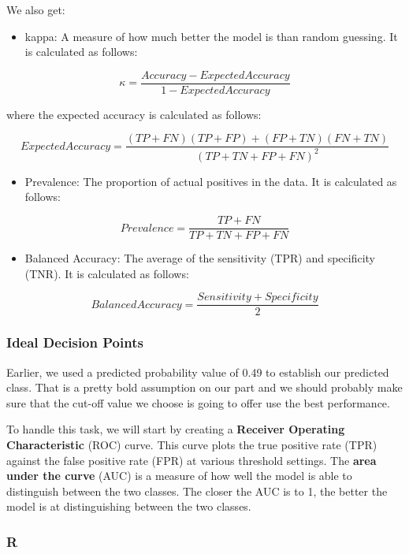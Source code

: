\documentclass[
  letterpaper,
]{krantz}
\providecommand{\tightlist}{%
  \setlength{\itemsep}{0pt}\setlength{\parskip}{0pt}}\usepackage{longtable,booktabs,array}
\begin{document}
We also get:

\begin{itemize}
\tightlist
\item
  kappa: A measure of how much better the model is than random guessing.
  It is calculated as follows:
\end{itemize}

\[\kappa = \frac{Accuracy - ExpectedAccuracy}{1 - ExpectedAccuracy}\]

where the expected accuracy is calculated as follows:

\[ExpectedAccuracy = \frac{(TP + FN)(TP + FP) + (FP + TN)(FN + TN)}{(TP + TN + FP + FN)^2}\]

\begin{itemize}
\tightlist
\item
  Prevalence: The proportion of actual positives in the data. It is
  calculated as follows:
\end{itemize}

\[Prevalence = \frac{TP + FN}{TP + TN + FP + FN}\]

\begin{itemize}
\tightlist
\item
  Balanced Accuracy: The average of the sensitivity (TPR) and
  specificity (TNR). It is calculated as follows:
\end{itemize}

\[Balanced Accuracy = \frac{Sensitivity + Specificity}{2}\]

\subsubsection{Ideal Decision Points}\label{ideal-decision-points}

Earlier, we used a predicted probability value of 0.49 to establish our
predicted class. That is a pretty bold assumption on our part and we
should probably make sure that the cut-off value we choose is going to
offer use the best performance.

To handle this task, we will start by creating a \textbf{Receiver
Operating Characteristic} (ROC) curve. This curve plots the true
positive rate (TPR) against the false positive rate (FPR) at various
threshold settings. The \textbf{area under the curve} (AUC) is a measure
of how well the model is able to distinguish between the two classes.
The closer the AUC is to 1, the better the model is at distinguishing
between the two classes.

\subsubsection{R}
\end{document}

